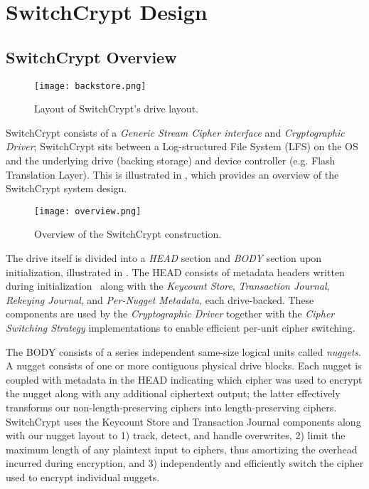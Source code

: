 \section{SwitchCrypt Design} \label{sec:design}

\subsection{SwitchCrypt Overview} \label{subsec:overview}

\begin{figure}[t]
   \centering
   \texttt{[image: backstore.png]}
   \caption{Layout of SwitchCrypt's drive layout.}\label{fig:backstore}
\end{figure}

SwitchCrypt consists of a \emph{Generic Stream Cipher interface} and
\emph{Cryptographic Driver}; SwitchCrypt sits between a Log-structured File
System (LFS) on the OS and the underlying drive (backing storage) and device
controller (e.g. Flash Translation Layer). This is illustrated in
, which provides an overview of the SwitchCrypt system design.

\begin{figure}[ht]
   \centering
   \texttt{[image: overview.png]}
   \caption{Overview of the SwitchCrypt construction.}\label{fig:overview}
\end{figure}

The drive itself is divided into a \emph{HEAD} section and \emph{BODY} section
upon initialization, illustrated in . The HEAD consists of
metadata headers written during initialization~\cite{StrongBox} along with the
\emph{Keycount Store}, \emph{Transaction Journal}, \emph{Rekeying Journal}, and
\emph{Per-Nugget Metadata}, each drive-backed. These components are used by the
\emph{Cryptographic Driver} together with the \emph{Cipher Switching Strategy}
implementations to enable efficient per-unit cipher switching.

The BODY consists of a series independent same-size logical units called
\emph{nuggets}. A nugget consists of one or more contiguous physical drive
blocks. Each nugget is coupled with metadata in the HEAD indicating which cipher
was used to encrypt the nugget along with any additional ciphertext output; the
latter effectively transforms our non-length-preserving ciphers into
length-preserving ciphers. SwitchCrypt uses the Keycount Store and Transaction
Journal components along with our nugget layout to 1) track, detect, and handle
overwrites, 2) limit the maximum length of any plaintext input to ciphers, thus
amortizing the overhead incurred during encryption, and 3) independently and
efficiently switch the cipher used to encrypt individual nuggets.

